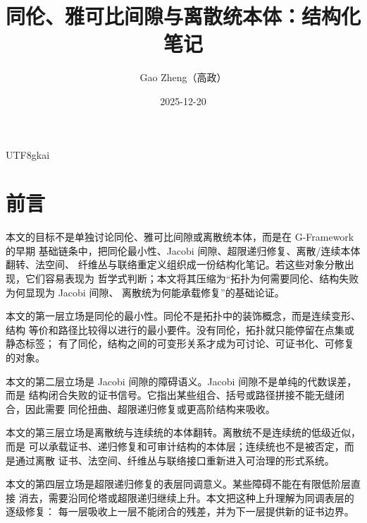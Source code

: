 \documentclass[12pt]{article}
\begin{document}
\begin{CJK*}{UTF8}{gkai}

\newcommand{\CertificateAuthorCN}{Gao Zheng（高政）}
\newcommand{\GZGMS}{\ensuremath{\mathsf{GZ\text{-}GMS}}}
\newcommand{\GZCBT}{\ensuremath{\mathsf{GZ\text{-}CBT}}}
\newcommand{\GZTLC}{\ensuremath{\mathsf{GZ\text{-}TLC}}}
\newcommand{\GZLCurv}{\ensuremath{\mathsf{GZ\text{-}LCurv}}}
\newcommand{\CHcantor}{\ensuremath{\mathrm{CH}}}
\newcommand{\GAlgebra}{\ensuremath{\mathsf{G\text{-}Algebra}}}
\newcommand{\Jac}{\ensuremath{\operatorname{Jac}}}
\newcommand{\CVexplicit}{\ensuremath{\checkmark}}
\newcommand{\CVinstance}{\ensuremath{\bigcirc}}
\title{同伦、雅可比间隙与离散统本体：结构化笔记}
\author{\CertificateAuthorCN}
\date{2025-12-20}
\maketitle

\section*{前言}

本文的目标不是单独讨论同伦、雅可比间隙或离散统本体，而是在 G-Framework 的早期
基础链条中，把同伦最小性、Jacobi 间隙、超限递归修复、离散/连续本体翻转、法空间、
纤维丛与联络重定义组织成一份结构化笔记。若这些对象分散出现，它们容易表现为
哲学式判断；本文将其压缩为“拓扑为何需要同伦、结构失败为何显现为 Jacobi 间隙、
离散统为何能承载修复”的基础论证。

本文的第一层立场是同伦的最小性。同伦不是拓扑中的装饰概念，而是连续变形、结构
等价和路径比较得以进行的最小要件。没有同伦，拓扑就只能停留在点集或静态标签；
有了同伦，结构之间的可变形关系才成为可讨论、可证书化、可修复的对象。

本文的第二层立场是 Jacobi 间隙的障碍语义。Jacobi 间隙不是单纯的代数误差，而是
结构闭合失败的证书信号。它指出某些组合、括号或路径拼接不能无缝闭合，因此需要
同伦扭曲、超限递归修复或更高阶结构来吸收。

本文的第三层立场是离散统与连续统的本体翻转。离散统不是连续统的低级近似，而是
可以承载证书、递归修复和可审计结构的本体层；连续统也不是被否定，而是通过离散
证书、法空间、纤维丛与联络接口重新进入可治理的形式系统。

本文的第四层立场是超限递归修复的表层同调意义。某些障碍不能在有限低阶层直接
消去，需要沿同伦塔或超限递归继续上升。本文把这种上升理解为同调表层的逐级修复：
每一层吸收上一层不能闭合的残差，并为下一层提供新的证书边界。


\end{CJK*}
\end{document}
